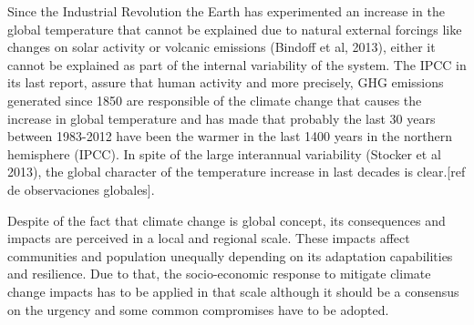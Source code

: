 Since the Industrial Revolution the Earth has experimented an increase in the global temperature that cannot be explained due to natural external forcings like changes on solar activity or volcanic emissions (Bindoff et al, 2013), either it cannot be explained as part of the internal variability of the system. The IPCC in its last report, assure that human activity and more precisely, GHG emissions generated since 1850 are responsible of the climate change that causes the increase in global temperature and has made that probably the last 30 years between 1983-2012 have been the warmer in the last 1400 years in the northern hemisphere (IPCC). In spite of the large interannual variability (Stocker et al 2013), the global character of the temperature increase in last decades is clear.[ref de observaciones globales].



Despite of the fact that climate change is global concept, its consequences and impacts are perceived in a local and regional scale. These impacts affect communities and population unequally depending on its adaptation capabilities and resilience. Due to that, the socio-economic response to mitigate climate change impacts has to be applied in that scale although it should be a consensus on the urgency and some common compromises have to be adopted.


